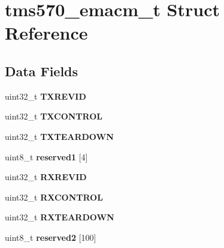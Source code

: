\hypertarget{structtms570__emacm__t}{}\section{tms570\+\_\+emacm\+\_\+t Struct Reference}
\label{structtms570__emacm__t}
\subsection*{Data Fields}
\begin{DoxyCompactItemize}
\item 
\mbox{\label{structtms570__emacm__t_a30e5229621b897791cb6627ad43562c7}} 
uint32\+\_\+t {\bfseries T\+X\+R\+E\+V\+ID}
\item 
\mbox{\label{structtms570__emacm__t_ab6bc9c6062d7cc0ccebc8094fce9b83e}} 
uint32\+\_\+t {\bfseries T\+X\+C\+O\+N\+T\+R\+OL}
\item 
\mbox{\label{structtms570__emacm__t_ac38a62248fcac8a84f4652be742b8f85}} 
uint32\+\_\+t {\bfseries T\+X\+T\+E\+A\+R\+D\+O\+WN}
\item 
\mbox{\label{structtms570__emacm__t_a09ec9ad36481203797f0d9c916d4c4ef}} 
uint8\+\_\+t {\bfseries reserved1} \mbox{[}4\mbox{]}
\item 
\mbox{\label{structtms570__emacm__t_a392d15cae825eb81e656d63663085f47}} 
uint32\+\_\+t {\bfseries R\+X\+R\+E\+V\+ID}
\item 
\mbox{\label{structtms570__emacm__t_a8ddf8eb9c4ba9c2db3f64ab1505eea42}} 
uint32\+\_\+t {\bfseries R\+X\+C\+O\+N\+T\+R\+OL}
\item 
\mbox{\label{structtms570__emacm__t_a44ca72dd74dbf559e014b6339c753c96}} 
uint32\+\_\+t {\bfseries R\+X\+T\+E\+A\+R\+D\+O\+WN}
\item 
\mbox{\label{structtms570__emacm__t_ac51e9aa53caba95e9934fad5a8a08836}} 
uint8\+\_\+t {\bfseries reserved2} \mbox{[}100\mbox{]}
\item 
\mbox{\label{structtms570__emacm__t_aa64e1efa1ae31339370a468d67409bda}} 

\end{DoxyCompactItemize}
